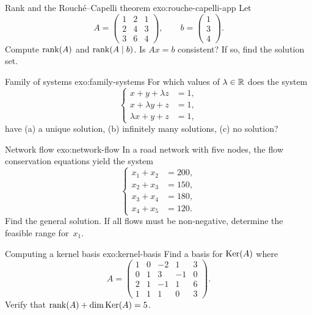 \begin{exercise}{Rank and the Rouch\'{e}--Capelli theorem
\intermediate}{exo:rouche-capelli-app}
Let
\[
  A = \begin{pmatrix}
    1 & 2 & 1\\
    2 & 4 & 3\\
    3 & 6 & 4
  \end{pmatrix},
  \qquad
  b = \begin{pmatrix} 1\\3\\4 \end{pmatrix}.
\]
Compute $\operatorname{rank}(A)$ and $\operatorname{rank}(A\mid b)$. Is $Ax = b$ consistent?
If so, find the solution set.
\end{exercise}

\begin{exercise}{Family of systems \intermediate}{exo:family-systems}
For which values of $\lambda\in{\mathbb{R}}$ does the system
\[
  \left\{
  \begin{aligned}
    x + y + \lambda z &= 1,\\
    x + \lambda y + z &= 1,\\
    \lambda x + y + z &= 1,
  \end{aligned}
  \right.
\]
have (a) a unique solution, (b) infinitely many solutions,
(c) no solution?
\end{exercise}

\begin{exercise}{Network flow \intermediate}{exo:network-flow}
In a road network with five nodes, the flow conservation equations
yield the system
\[
  \left\{
  \begin{aligned}
    x_1 + x_2 &= 200,\\
    x_2 + x_3 &= 150,\\
    x_3 + x_4 &= 180,\\
    x_4 + x_5 &= 120.
  \end{aligned}
  \right.
\]
Find the general solution. If all flows must be non-negative,
determine the feasible range for~$x_1$.
\end{exercise}

\begin{exercise}{Computing a kernel basis \intermediate}{exo:kernel-basis}
Find a basis for $\operatorname{Ker}(A)$ where
\[
  A = \begin{pmatrix}
    1 & 0 & -2 & 1 & 3\\
    0 & 1 & 3 & -1 & 0\\
    2 & 1 & -1 & 1 & 6\\
    1 & 1 & 1 & 0 & 3
  \end{pmatrix}.
\]
Verify that $\operatorname{rank}(A) + \dim\operatorname{Ker}(A) = 5$.
\end{exercise}

